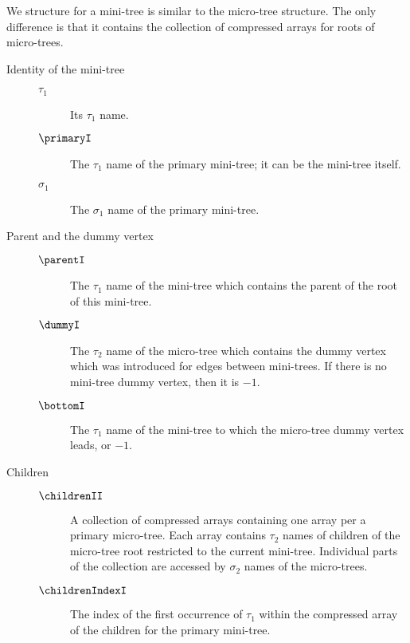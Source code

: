 We structure for a mini-tree is similar to the micro-tree structure.
The only difference is that it contains the collection of compressed arrays for roots of micro-trees.
\begin{description}
	\item[Identity of the mini-tree]
	\begin{description}
		\item[]
		
		\item[$\tau_1$]
		Its $\tau_1$ name.

		\item[$\primaryI$]
		The $\tau_1$ name of the primary mini-tree; it can be the mini-tree itself.
		
		\item[$\sigma_1$]
		The $\sigma_1$ name of the primary mini-tree.
	\end{description}

	\item[Parent and the dummy vertex]
	\begin{description}
		\item[]

		\item[$\parentI$]
		The $\tau_1$ name of the mini-tree which contains the parent of the root of this mini-tree.
		
		\item[$\dummyI$]
		The $\tau_2$ name of the micro-tree which contains the dummy vertex which was introduced for edges between mini-trees.
		If there is no mini-tree dummy vertex, then it is $-1$.
		
		\item[$\bottomI$]
		The $\tau_1$ name of the mini-tree to which the micro-tree dummy vertex leads, or $-1$.
	\end{description}
	
	\item[Children]
	\begin{description}
		\item[]

		\item[$\childrenII$]
		A collection of compressed arrays containing one array per a primary micro-tree.
		Each array contains $\tau_2$ names of children of the micro-tree root restricted to the current mini-tree.
		Individual parts of the collection are accessed by $\sigma_2$ names of the micro-trees.
		
		\item[$\childrenIndexI$]
		The index of the first occurrence of $\tau_1$ within the compressed array of the children for the primary mini-tree.
		

\end{description}
\end{description}
